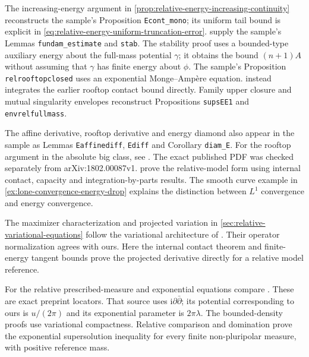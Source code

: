 The increasing-energy argument in \cref{prop:relative-energy-increasing-continuity} reconstructs the sample's Proposition \texttt{Econt\_mono}; its uniform tail bound is explicit in \eqref{eq:relative-energy-uniform-truncation-error}.  supply the sample's Lemmas \texttt{fundam\_estimate} and \texttt{stab}. The stability proof uses a bounded-type auxiliary energy about the full-mass potential $\gamma$; it obtains the bound $(n+1)A$ without assuming that $\gamma$ has finite energy about $\phi$. The sample's Proposition \texttt{relrooftopclosed} uses an exponential Monge--Amp\`ere equation.  instead integrates the earlier rooftop contact bound directly. Family upper closure and mutual singularity envelopes reconstruct Propositions \texttt{supsEE1} and \texttt{envrelfullmass}.

The affine derivative, rooftop derivative and energy diamond also appear in the sample as Lemmas \texttt{Eaffinediff}, \texttt{Ediff} and Corollary \texttt{diam\_E}. For the rooftop argument in the absolute big class, see \cite[Proposition 3.2, Corollary 3.3 and Proposition 3.4, pp.~3067--3069]{DDNL18big}. The exact published PDF was checked separately from arXiv:1802.00087v1.  prove the relative-model form using internal contact, capacity and integration-by-parts results. The smooth curve example in \cref{ex:lone-convergence-energy-drop} explains the distinction between $L^1$ convergence and energy convergence.

The maximizer characterization and projected variation in \cref{sec:relative-variational-equations} follow the variational architecture of \cite[Theorem 4.1 and Lemma 4.2, pp.~207--209]{BBGZ13}. Their operator normalization agrees with ours. Here the internal contact theorem and finite-energy tangent bounds prove the projected derivative directly for a relative model reference.

For the relative prescribed-measure and exponential equations compare \cite[Theorem 4.3, p.~20; Theorem 5.3 and Lemma 5.4, pp.~24--25]{DDNL2020equationsv3}. These are exact preprint locators. That source uses $\mathrm{i}\partial\bar\partial$; its potential corresponding to ours is $u/(2\pi)$ and its exponential parameter is $2\pi\lambda$. The bounded-density proofs use variational compactness. Relative comparison and domination prove the exponential supersolution inequality for every finite non-pluripolar measure, with positive reference mass.

